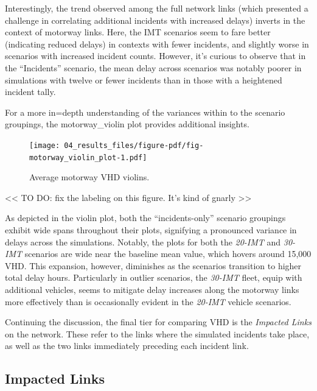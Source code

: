 \documentclass[fancy, oneside, mastersfancy, ms]{byuthesis}
\begin{document}
Interestingly, the trend observed among the full network links (which
presented a challenge in correlating additional incidents with increased
delays) inverts in the context of motorway links. Here, the IMT
scenarios seem to fare better (indicating reduced delays) in contexts
with fewer incidents, and slightly worse in scenarios with increased
incident counts. However, it's curious to observe that in the
``Incidents'' scenario, the mean delay across scenarios was notably
poorer in simulations with twelve or fewer incidents than in those with
a heightened incident tally.

For a more in=depth understanding of the variances within to the
scenario groupings, the motorway\_violin plot provides additional
insights.

\begin{figure}

{\centering \texttt{[image: 04\_results\_files/figure-pdf/fig-motorway\_violin\_plot-1.pdf]}

}

\caption{\label{fig-motorway_violin_plot}Average motorway VHD violins.}

\end{figure}

\textless\textless{} TO DO: fix the labeling on this figure. It's kind
of gnarly \textgreater\textgreater{}

As depicted in the violin plot, both the ``incidents-only'' scenario
groupings exhibit wide spans throughout their plots, signifying a
pronounced variance in delays across the simulations. Notably, the plots
for both the \emph{20-IMT} and \emph{30-IMT} scenarios are wide near the
baseline mean value, which hovers around 15,000 VHD. This expansion,
however, diminishes as the scenarios transition to higher total delay
hours. Particularly in outlier scenarios, the \emph{30-IMT} fleet, equip
with additional vehicles, seems to mitigate delay increases along the
motorway links more effectively than is occasionally evident in the
\emph{20-IMT} vehicle scenarios.

Continuing the discussion, the final tier for comparing VHD is the
\emph{Impacted Links} on the network. These refer to the links where the
simulated incidents take place, as well as the two links immediately
preceding each incident link.

\hypertarget{impacted-links}{%
\subsection{Impacted Links}\label{impacted-links}}
\end{document}
